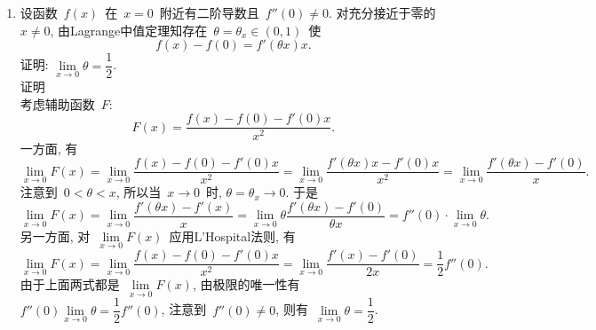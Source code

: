 \documentclass[UTF8,a4paper,20pt]{article}
\begin{document}
\begin{enumerate}
\item 设函数~$f(x)$~在~$x=0$~附近有二阶导数且~$f''(0)\neq 0$. 对充分接近于零的~$x\neq 0$, 由Lagrange中值定理知存在~$\theta=\theta_x\in(0,1)$~使
\[f(x)-f(0)=f'(\theta x)x.\]
证明: $\lim\limits_{x\to 0}\theta=\dfrac{1}{2}$.\\
{\heiti 证明}\\
考虑辅助函数~$F$:
\[F(x)=\dfrac{f(x)-f(0)-f'(0)x}{x^2}.\]
一方面, 有
\[\lim\limits_{x\to 0}F(x)=\lim\limits_{x\to 0}\dfrac{f(x)-f(0)-f'(0)x}{x^2}=\lim\limits_{x\to 0}\dfrac{f'(\theta x)x-f'(0)x}{x^2}=\lim\limits_{x\to 0}\dfrac{f'(\theta x)-f'(0)}{x}.\]
注意到~$0<\theta<x$, 所以当~$x\to 0$~时, $\theta=\theta_x\to 0$. 于是
\[\lim\limits_{x\to 0} F(x)=\lim\limits_{x\to 0}\dfrac{f'(\theta x)-f'(x)}{x}=\lim\limits_{x\to 0}\theta \dfrac{f'(\theta x)-f'(0)}{\theta x}=f''(0)\cdot\lim\limits_{x\to0}\theta.\]
另一方面, 对~$\lim\limits_{x\to0}F(x)$~应用L'Hospital法则, 有
\[\lim\limits_{x\to 0} F(x)=\lim\limits_{x\to 0}\dfrac{f(x)-f(0)-f'(0)x}{x^2}=\lim\limits_{x\to 0}\dfrac{f'(x)-f'(0)}{2x}=\dfrac{1}{2}f''(0).\]
由于上面两式都是~$\lim\limits_{x\to 0} F(x)$, 由极限的唯一性有~$f''(0)\lim\limits_{x\to0}\theta=\dfrac{1}{2}f''(0)$, 注意到~$f''(0)\neq0$, 则有~$\lim\limits_{x\to 0}\theta =\dfrac{1}{2}$. 
\end{enumerate}

\clearpage                                                        
\end{document}
